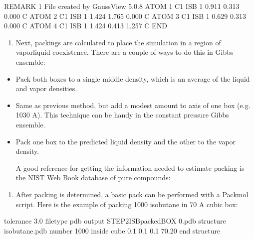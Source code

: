 \documentclass[letterpaper,10pt,english]{sphinxmanual}
\begin{document}
\begin{sphinxVerbatim}[commandchars=\\\{\}]
REMARK   1 File created by GaussView 5.0.8
ATOM     1  C1   ISB  1   0.911  \PYGZhy{}0.313    0.000  C
ATOM     2  C1   ISB  1   1.424  \PYGZhy{}1.765    0.000  C
ATOM     3  C1   ISB  1  \PYGZhy{}0.629  \PYGZhy{}0.313    0.000  C
ATOM     4  C1   ISB  1   1.424   0.413   \PYGZhy{}1.257  C
END
\end{sphinxVerbatim}
\begin{enumerate}
%
\setcounter{enumi}{1}
\item {} 
Next, packings are calculated to place the simulation in a region of vapor\sphinxhyphen{}liquid coexistence. There are a couple of ways to do this in Gibbs ensemble:

\end{enumerate}
\begin{itemize}
\item {} 
Pack both boxes to a single middle density, which is an average of the liquid and vapor densities.

\item {} 
Same as previous method, but add a modest amount to axis of one box (e.g. 10\sphinxhyphen{}30 A). This technique can be handy in the constant pressure Gibbs ensemble.

\item {} 
Pack one box to the predicted liquid density and the other to the vapor density.

A good reference for getting the information needed to estimate packing is the NIST Web Book database of pure compounds:


\end{itemize}
\begin{enumerate}
%
\setcounter{enumi}{2}
\item {} 
After packing is determined, a basic pack can be performed with a Packmol script. Here is the example of packing 1000 isobutane in 70 A cubic box:

\end{enumerate}

\begin{sphinxVerbatim}[commandchars=\\\{\}]
tolerance   3.0
filetype    pdb
output      STEP2\PYGZus{}ISB\PYGZus{}packed\PYGZus{}BOX 0.pdb
structure   isobutane.pdb
number      1000
inside cube 0.1   0.1   0.1   70.20
end     structure
\end{sphinxVerbatim}
\end{document}
